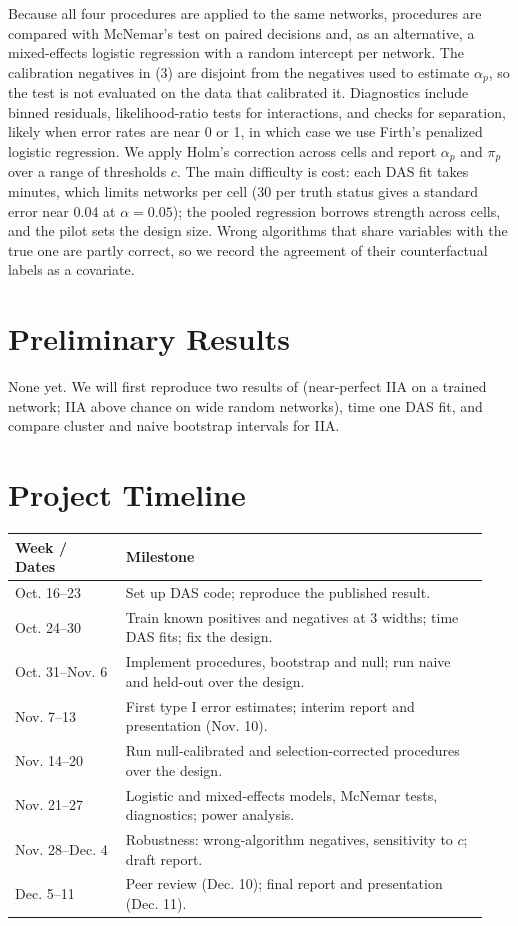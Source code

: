 \documentclass[11pt]{article}
\begin{document}
Because all four procedures are applied to the same networks, procedures are compared
with McNemar's test on paired decisions and, as an alternative, a mixed-effects logistic
regression with a random intercept per network. The calibration negatives in (3) are disjoint from
the negatives used to estimate $\alpha_p$, so the test is not evaluated on the data that
calibrated it. Diagnostics include binned residuals, likelihood-ratio tests for interactions, and
checks for separation, likely when error rates are near 0 or 1, in which case we use
Firth's penalized logistic regression. We apply Holm's correction across cells and
report $\alpha_p$ and $\pi_p$ over a range of thresholds $c$. The main difficulty is
cost: each DAS fit takes minutes, which limits networks per cell (30 per truth status
gives a standard error near 0.04 at $\alpha = 0.05$); the pooled regression borrows
strength across cells, and the pilot sets the design size. Wrong algorithms that share
variables with the true one are partly correct, so we record the agreement of their
counterfactual labels as a covariate.

\section{Preliminary Results}
None yet. We will first reproduce two results of \citet{geiger2024finding} (near-perfect
IIA on a trained network; IIA above chance on wide random networks), time one DAS fit,
and compare cluster and naive bootstrap intervals for IIA.

\section{Project Timeline}
\begin{center}
\small
\begin{tabular}{@{}p{0.22\linewidth}p{0.72\linewidth}@{}}
\toprule
\textbf{Week / Dates} & \textbf{Milestone} \\
\midrule
Oct. 16--23 & Set up DAS code; reproduce the published result. \\
Oct. 24--30 & Train known positives and negatives at 3 widths; time DAS fits; fix the design. \\
Oct. 31--Nov. 6 & Implement procedures, bootstrap and null; run naive and held-out over the design. \\
Nov. 7--13 & First type I error estimates; interim report and presentation (Nov. 10). \\
Nov. 14--20 & Run null-calibrated and selection-corrected procedures over the design. \\
Nov. 21--27 & Logistic and mixed-effects models, McNemar tests, diagnostics; power analysis. \\
Nov. 28--Dec. 4 & Robustness: wrong-algorithm negatives, sensitivity to $c$; draft report. \\
Dec. 5--11 & Peer review (Dec. 10); final report and presentation (Dec. 11). \\
\bottomrule
\end{tabular}
\end{center}

{\small
\setlength{\bibsep}{1pt}


}
\end{document}

